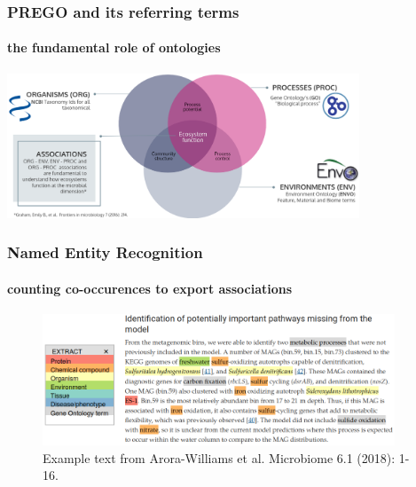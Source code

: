 \documentclass{beamer}
\begin{document}



   \begin{frame}
      \frametitle{PREGO and its referring terms}
      \framesubtitle{the fundamental role of ontologies}
      \includegraphics[width=105mm]{resources/prego_triple_associations.png}
   \end{frame}

   \begin{frame}
      \frametitle{Named Entity Recognition}
      \framesubtitle{counting co-occurences to export associations}
      \begin{figure}
         \includegraphics[width=105mm]{resources/extract_example_transp.png}
         \caption{
            \scriptsize Example text from Arora-Williams et al. Microbiome 6.1 (2018): 1-16.
         }
      \end{figure}
   \end{frame}
\end{document}
